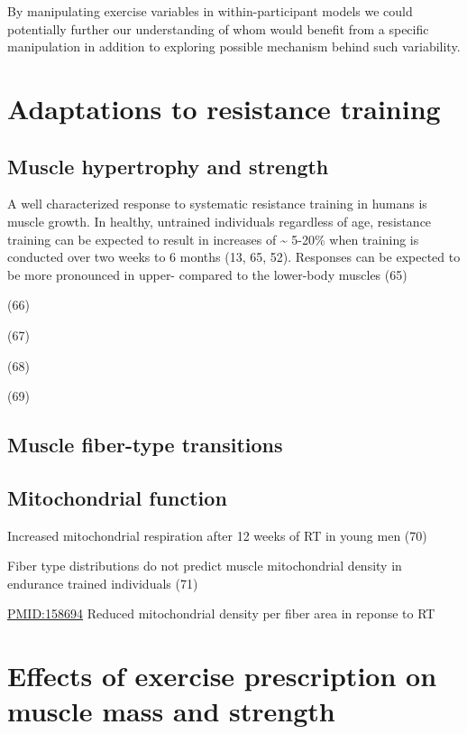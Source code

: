 \documentclass[twoside,10pt]{gihclass} %
\begin{document}
By manipulating exercise variables in within-participant models we could potentially further our understanding of whom would benefit from a specific manipulation in addition to exploring possible mechanism behind such variability.

\hypertarget{adaptations-to-resistance-training}{%
\section{Adaptations to resistance training}\label{adaptations-to-resistance-training}}

\hypertarget{muscle-hypertrophy-and-strength}{%
\subsection{Muscle hypertrophy and strength}\label{muscle-hypertrophy-and-strength}}

A well characterized response to systematic resistance training in humans is muscle growth. In healthy, untrained individuals regardless of age, resistance training can be expected to result in increases of \textasciitilde{} 5-20\% when training is conducted over two weeks to 6 months
(13, 65, 52).
Responses can be expected to be more pronounced in upper- compared to the lower-body muscles
(65)

(66)

(67)

(68)

(69)

\hypertarget{muscle-fiber-type-transitions}{%
\subsection{Muscle fiber-type transitions}\label{muscle-fiber-type-transitions}}

\hypertarget{mitochondrial-function}{%
\subsection{Mitochondrial function}\label{mitochondrial-function}}

Increased mitochondrial respiration after 12 weeks of RT in young men (70)

Fiber type distributions do not predict muscle mitochondrial density in endurance trained individuals (71)

\url{PMID:158694} Reduced mitochondrial density per fiber area in reponse to RT

\hypertarget{effects-of-exercise-prescription-on-muscle-mass-and-strength}{%
\section{Effects of exercise prescription on muscle mass and strength}\label{effects-of-exercise-prescription-on-muscle-mass-and-strength}}
\end{document}
